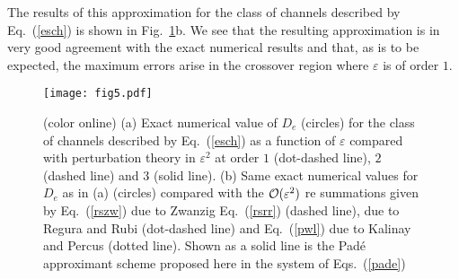 \documentclass[pre,showpacs,preprintnumbers,amsmath,amssymb,superscriptaddress]{revtex4-1}
\begin{document}
{{The results of this approximation for the class of channels described by Eq.~(\ref{esch}) is shown in Fig.~\ref{sinediff}b. We see that the resulting approximation is in very good agreement with the exact numerical results and that, as is to be expected, the maximum
errors arise in the crossover region where $\varepsilon$ is of order $1$.
\begin{figure}
\begin{center}
  \texttt{[image: fig5.pdf]}
  \caption{(color online) (a) Exact numerical value of $D_e$ (circles) for the class of channels described 
  by Eq.~(\ref{esch}) as a function of $\varepsilon$ compared with perturbation theory 
  in $\varepsilon^2$ at order $1$ (dot-dashed line), $2$ (dashed line) and $3$ (solid line).
  (b) Same exact numerical values for $D_e$ as in (a) (circles) compared with the ${\cal O}(\varepsilon^2)$ re summations given by Eq.~(\ref{rszw}) due to Zwanzig \cite{zwa1991} Eq.~(\ref{rsrr}) (dashed line), due to Regura and Rubi \cite{reg2001} (dot-dashed line) and Eq.~(\ref{pwl}) due to Kalinay and Percus \cite{kal2006}
  (dotted line). Shown as a solid line is the Pad\'e approximant scheme proposed here
  in the system of Eqs.~(\ref{pade})
 }\label{sinediff}
\end{center}
\end{figure}


}}
\end{document}
